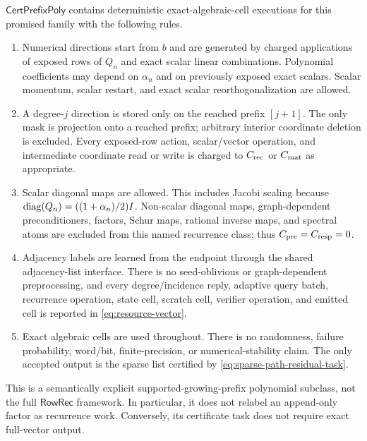 \begin{definition}
\label{def:cert-prefix-poly}
$\mathsf{CertPrefixPoly}$ contains deterministic exact-algebraic-cell
executions for this promised family with the following rules.

\begin{enumerate}[label=(\roman*)]
\item Numerical directions start from $b$ and are generated by charged
      applications of exposed rows of $Q_n$ and exact scalar linear
      combinations.  Polynomial coefficients may depend on $\alpha_n$ and on
      previously exposed exact scalars.  Scalar momentum, scalar restart,
      and exact scalar reorthogonalization are allowed.
\item A degree-$j$ direction is stored only on the reached prefix
      $[j+1]$.  The only mask is projection onto a reached prefix; arbitrary
      interior coordinate deletion is excluded.  Every exposed-row action,
      scalar/vector operation, and intermediate coordinate read or write is
      charged to $C_{\rm rec}$ or $C_{\rm mat}$ as appropriate.
\item Scalar diagonal maps are allowed.  This includes Jacobi scaling because
      $\operatorname{diag}(Q_n)=((1+\alpha_n)/2)I$.  Non-scalar diagonal maps,
      graph-dependent preconditioners, factors, Schur maps, rational inverse
      maps, and spectral atoms are excluded from this named recurrence class;
      thus $C_{\rm pre}=C_{\rm resp}=0$.
\item Adjacency labels are learned from the endpoint through the shared
      adjacency-list interface.  There is no seed-oblivious or graph-dependent
      preprocessing, and every degree/incidence reply, adaptive query batch,
      recurrence operation, state cell, scratch cell, verifier operation, and
      emitted cell is reported in \cref{eq:resource-vector}.
\item Exact algebraic cells are used throughout.  There is no randomness,
      failure probability, word/bit, finite-precision, or numerical-stability
      claim.  The only accepted output is the sparse list certified by
      \cref{eq:sparse-path-residual-task}.
\end{enumerate}
\end{definition}

This is a semantically explicit supported-growing-prefix polynomial subclass,
not the full $\mathsf{RowRec}$ framework.  In particular, it does not relabel
an append-only factor as recurrence work.  Conversely, its certificate task
does not require exact full-vector output.
